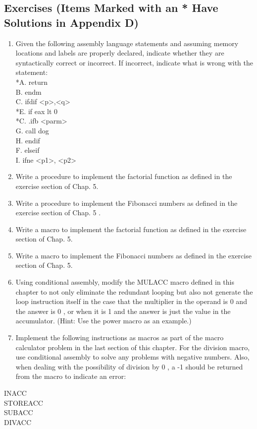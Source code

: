 \documentclass[10pt]{book}
\begin{document}
\subsection{Exercises (Items Marked with an * Have Solutions in Appendix D)}
\begin{enumerate}
  \item Given the following assembly language statements and assuming memory locations and labels are properly declared, indicate whether they are syntactically correct or incorrect. If incorrect, indicate what is wrong with the statement:\\
*A. return\\
B. endm\\
C. ifdif <p>,<q>\\
*E. if eax lt 0\\
*C. .ifb <parm>\\
G. call dog\\
H. endif\\
F. elseif\\
I. ifne <p1>, <p2>
  \item Write a procedure to implement the factorial function as defined in the exercise section of Chap. 5.
  \item Write a procedure to implement the Fibonacci numbers as defined in the exercise section of Chap. 5 .
  \item Write a macro to implement the factorial function as defined in the exercise section of Chap. 5.
  \item Write a macro to implement the Fibonacci numbers as defined in the exercise section of Chap. 5.
  \item Using conditional assembly, modify the MULACC macro defined in this chapter to not only eliminate the redundant looping but also not generate the loop instruction itself in the case that the multiplier in the operand is 0 and the answer is 0 , or when it is 1 and the answer is just the value in the accumulator. (Hint: Use the power macro as an example.)
  \item Implement the following instructions as macros as part of the macro calculator problem in the last section of this chapter. For the division macro, use conditional assembly to solve any problems with negative numbers. Also, when dealing with the possibility of division by 0 , a -1 should be returned from the macro to indicate an error:
\end{enumerate}


INACC\\
STOREACC\\
SUBACC\\
DIVACC
\end{document}
